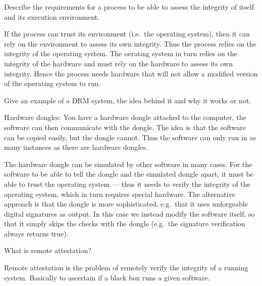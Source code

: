 \question[3]\label{q:trustcomp}
Describe the requirements for a process to be able to assess the integrity of 
itself and its execution environment.

\begin{solution}
  If the process can trust its environment (i.e.\ the operating system), then 
  it can rely on the environment to assess its own integrity.
  Thus the process relies on the integrity of the operating system.
  The oerating system in turn relies on the integrity of the hardware and must 
  rely on the hardware to assess its own integrity.
  Hence the process needs hardware that will not allow a modified version of 
  the operating system to run.
\end{solution}


\question[4]\label{q:trustcomp}
Give an example of a DRM system, the idea behind it and why it works or not.

\begin{solution}
  Hardware dongles:
  You have a hardware dongle attached to the computer, the software can then 
  communicate with the dongle.
  The idea is that the software can be copied easily, but the dongle cannot.
  Thus the software can only run in as many instances as there are hardware 
  dongles.

  The hardware dongle can be simulated by other software in many cases.
  For the software to be able to tell the dongle and the simulated dongle 
  apart, it must be able to trust the operating system --- thus it needs to 
  verify the integrity of the operating system, which in turn requires special 
  hardware.
  The alternative approach is that the dongle is more sophisticated, e.g.\ that 
  it uses unforgeable digital signatures as output.
  In this case we instead modify the software itself, so that it simply skips 
  the checks with the dongle (e.g.\ the signature verification always returns 
  true).
\end{solution}


\question[2]\label{q:trustcomp}
What is remote attestation?

\begin{solution}
  Remote attestation is the problem of remotely verify the integrity of 
  a running system.
  Basically to ascertain if a black box runs a given software.
\end{solution}


